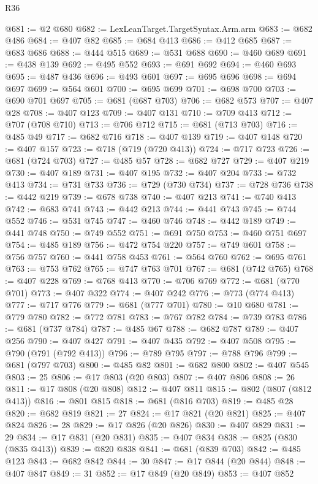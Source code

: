 \begin{lexlean}{R36}
\begin{coremodule}
@681 := @2 @680
@682 := LexLeanTarget.TargetSyntax.Arm.arm
@683 := @682 @486
@684 := @407 @82
@685 := @684 @413
@686 := @412 @685
@687 := @683 @686
@688 := @444 @515
@689 := @531 @688
@690 := @460 @689
@691 := @438 @139
@692 := @495 @552
@693 := @691 @692
@694 := @460 @693
@695 := @487 @436
@696 := @493 @601
@697 := @695 @696
@698 := @694 @697
@699 := @564 @601
@700 := @695 @699
@701 := @698 @700
@703 := @690 @701 @697
@705 := @681 (@687 @703)
@706 := @682 @573
@707 := @407 @28
@708 := @407 @123
@709 := @407 @131
@710 := @709 @413
@712 := @707 (@708 @710)
@713 := @706 @712
@715 := @681 (@713 @703)
@716 := @485 @49
@717 := @682 @716
@718 := @407 @139
@719 := @407 @148
@720 := @407 @157
@723 := @718 (@719 (@720 @413))
@724 := @717 @723
@726 := @681 (@724 @703)
@727 := @485 @57
@728 := @682 @727
@729 := @407 @219
@730 := @407 @189
@731 := @407 @195
@732 := @407 @204
@733 := @732 @413
@734 := @731 @733
@736 := @729 (@730 @734)
@737 := @728 @736
@738 := @442 @219
@739 := @678 @738
@740 := @407 @213
@741 := @740 @413
@742 := @683 @741
@743 := @442 @213
@744 := @441 @743
@745 := @744 @552
@746 := @531 @745
@747 := @460 @746
@748 := @442 @189
@749 := @441 @748
@750 := @749 @552
@751 := @691 @750
@753 := @460 @751 @697
@754 := @485 @189
@756 := @472 @754 @220
@757 := @749 @601
@758 := @756 @757
@760 := @441 @758 @453
@761 := @564 @760
@762 := @695 @761
@763 := @753 @762
@765 := @747 @763 @701
@767 := @681 (@742 @765)
@768 := @407 @228
@769 := @768 @413
@770 := @706 @769
@772 := @681 (@770 @701)
@773 := @407 @322
@774 := @407 @242
@776 := @773 (@774 @413)
@777 := @717 @776
@779 := @681 (@777 @701)
@780 := @10 @680
@781 := @779 @780
@782 := @772 @781
@783 := @767 @782
@784 := @739 @783
@786 := @681 (@737 @784)
@787 := @485 @67
@788 := @682 @787
@789 := @407 @256
@790 := @407 @427
@791 := @407 @435
@792 := @407 @508
@795 := @790 (@791 (@792 @413))
@796 := @789 @795
@797 := @788 @796
@799 := @681 (@797 @703)
@800 := @485 @82
@801 := @682 @800
@802 := @407 @545
@803 := 25
@806 := @17 @803 (@20 @803)
@807 := @407 @806
@808 := 26
@811 := @17 @808 (@20 @808)
@812 := @407 @811
@815 := @802 (@807 (@812 @413))
@816 := @801 @815
@818 := @681 (@816 @703)
@819 := @485 @28
@820 := @682 @819
@821 := 27
@824 := @17 @821 (@20 @821)
@825 := @407 @824
@826 := 28
@829 := @17 @826 (@20 @826)
@830 := @407 @829
@831 := 29
@834 := @17 @831 (@20 @831)
@835 := @407 @834
@838 := @825 (@830 (@835 @413))
@839 := @820 @838
@841 := @681 (@839 @703)
@842 := @485 @123
@843 := @682 @842
@844 := 30
@847 := @17 @844 (@20 @844)
@848 := @407 @847
@849 := 31
@852 := @17 @849 (@20 @849)
@853 := @407 @852

\end{coremodule}
\end{lexlean}
